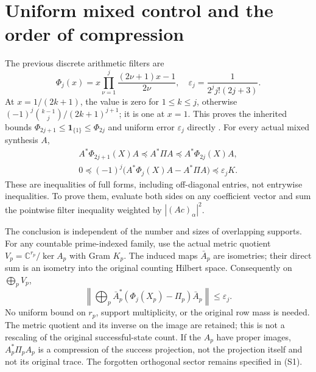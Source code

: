 \section{Uniform mixed control and the order of compression}
The previous discrete arithmetic filters are
\[
 \Phi_j(x)=x\prod_{\nu=1}^j\frac{(2\nu+1)x-1}{2\nu},\quad
 \varepsilon_j=\frac1{2^j j!(2j+3)}.
\]
At $x=1/(2k+1)$, the value is zero for $1\le k\le j$, otherwise
$(-1)^j\binom{k-1}{j}/(2k+1)^{j+1}$; it is one at $x=1$.
This proves the inherited bounds
$\Phi_{2j+1}\le\mathbf1_{\{1\}}\le\Phi_{2j}$ and uniform error
$\varepsilon_j$ directly \cite{Prior}. For every actual mixed synthesis $A$,
\[
 \begin{gathered}
 A^*\Phi_{2j+1}(X)A\preceq A^*\Pi A\preceq A^*\Phi_{2j}(X)A,\\
 0\preceq(-1)^j\bigl(A^*\Phi_j(X)A-A^*\Pi A\bigr)
          \preceq\varepsilon_j K.
 \end{gathered}\tag{U1}
\]
These are inequalities of full forms, including off-diagonal entries, not
entrywise inequalities. To prove them, evaluate both sides on any coefficient
vector and sum the pointwise filter inequality weighted by $|(Ac)_\alpha|^2$.

The conclusion is independent of the number and sizes of overlapping supports.
For any countable prime-indexed family, use the actual metric quotient
$V_p=\mathbb C^{r_p}/\ker A_p$ with Gram $K_p$. The induced maps $\bar A_p$
are isometries; their direct sum is an isometry into the original counting
Hilbert space. Consequently on $\bigoplus_pV_p$,
\[
 \boxed{\left\|\bigoplus_p\bar A_p^*
             (\Phi_j(X_p)-\Pi_p)\bar A_p\right\|\le\varepsilon_j.}
 \tag{U2}
\]
No uniform bound on $r_p$, support multiplicity, or the original row mass is
needed. The metric quotient and its inverse on the image are retained; this is
not a rescaling of the original successful-state count.
If the $A_p$ have proper images, $A_p^*\Pi_pA_p$ is a compression of the
success projection, not the projection itself and not its original trace.
The forgotten orthogonal sector remains specified in (S1).

